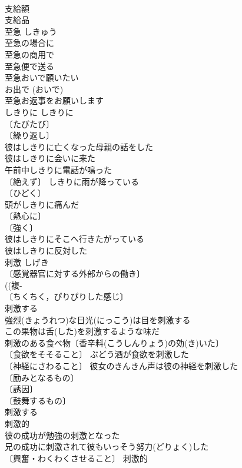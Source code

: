\documentclass[8pt]{extreport}
\begin{document}
\begin{CJK}{UTF8}{min}
\\	支給額 
\\	支給品 
\\	至急	しきゅう	
\\	至急の場合に 
\\	至急の商用で 
\\	至急便で送る 
\\	至急おいで願いたい
\\	お出で (おいで)　
\\	至急お返事をお願いします 
\\	しきりに	しきりに	
\\	〔たびたび〕
\\	〔繰り返し〕
\\	彼はしきりに亡くなった母親の話をした 
\\	彼はしきりに会いに来た 
\\	午前中しきりに電話が鳴った 
\\	〔絶えず〕 しきりに雨が降っている 
\\	〔ひどく〕
\\	頭がしきりに痛んだ 
\\	〔熱心に〕
\\	〔強く〕
\\	彼はしきりにそこへ行きたがっている 
\\	彼はしきりに反対した 
\\	刺激	しげき	
\\	〔感覚器官に対する外部からの働き〕
\\	((複-
\\	〔ちくちく，ぴりぴりした感じ〕
\\	刺激する 
\\	強烈(きょうれつ)な日光(にっこう)は目を刺激する 
\\	この果物は舌(した)を刺激するような味だ 
\\	刺激のある食べ物〔香辛料(こうしんりょう)の効(き)いた〕 
\\	〔食欲をそそること〕 ぶどう酒が食欲を刺激した 
\\	〔神経にさわること〕 彼女のきんきん声は彼の神経を刺激した 
\\	〔励みとなるもの〕
\\	〔誘因〕
\\	〔鼓舞するもの〕
\\	刺激する 
\\	刺激的 
\\	彼の成功が勉強の刺激となった 
\\	兄の成功に刺激されて彼もいっそう努力(どりょく)した 
\\	〔興奮・わくわくさせること〕 刺激的 

\end{CJK}
\end{document}
